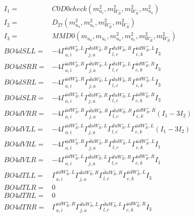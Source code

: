 \documentclass[A4,landscape]{article}
\begin{document}
\begin{align} 
I_1 = & C0D0check(m^2_{u_{{c}}}, m^2_{W_R^-}, m^2_{W_R^-}, m^2_{u_{{a}}}) \\ 
I_2 = & D_{27}(m^2_{u_{{a}}}, m^2_{u_{{c}}}, m^2_{W_R^-}, m^2_{W_R^-}) \\ 
I_3 = & MMD0(m_{u_{{a}}}, m_{u_{{c}}}, m^2_{u_{{a}}}, m^2_{u_{{c}}}, m^2_{W_R^-}, m^2_{W_R^-}) \\ 
  BO4dSLL= & -4  \Gamma^{\bar{u}d W_R^+,L}_{a, i} \Gamma^{\bar{d}u W_R^- ,R}_{j, a} \Gamma^{\bar{d}u W_R^- ,R}_{l, c} \Gamma^{\bar{u}d W_R^+,L}_{c, k} I_3 \\ 
  BO4dSRR= & -4  \Gamma^{\bar{u}d W_R^+,R}_{a, i} \Gamma^{\bar{d}u W_R^- ,L}_{j, a} \Gamma^{\bar{d}u W_R^- ,L}_{l, c} \Gamma^{\bar{u}d W_R^+,R}_{c, k} I_3 \\ 
  BO4dSRL= & -4  \Gamma^{\bar{u}d W_R^+,R}_{a, i} \Gamma^{\bar{d}u W_R^- ,L}_{j, a} \Gamma^{\bar{d}u W_R^- ,R}_{l, c} \Gamma^{\bar{u}d W_R^+,L}_{c, k} I_3 \\ 
  BO4dSLR= & -4  \Gamma^{\bar{u}d W_R^+,L}_{a, i} \Gamma^{\bar{d}u W_R^- ,R}_{j, a} \Gamma^{\bar{d}u W_R^- ,L}_{l, c} \Gamma^{\bar{u}d W_R^+,R}_{c, k} I_3 \\ 
  BO4dVRR= & -4  \Gamma^{\bar{u}d W_R^+,R}_{a, i} \Gamma^{\bar{d}u W_R^- ,R}_{j, a} \Gamma^{\bar{d}u W_R^- ,R}_{l, c} \Gamma^{\bar{u}d W_R^+,R}_{c, k} (I_1 - 3 I_2) \\ 
  BO4dVLL= & -4  \Gamma^{\bar{u}d W_R^+,L}_{a, i} \Gamma^{\bar{d}u W_R^- ,L}_{j, a} \Gamma^{\bar{d}u W_R^- ,L}_{l, c} \Gamma^{\bar{u}d W_R^+,L}_{c, k} (I_1 - 3 I_2) \\ 
  BO4dVRL= & -4  \Gamma^{\bar{u}d W_R^+,R}_{a, i} \Gamma^{\bar{d}u W_R^- ,R}_{j, a} \Gamma^{\bar{d}u W_R^- ,L}_{l, c} \Gamma^{\bar{u}d W_R^+,L}_{c, k} I_1 \\ 
  BO4dVLR= & -4  \Gamma^{\bar{u}d W_R^+,L}_{a, i} \Gamma^{\bar{d}u W_R^- ,L}_{j, a} \Gamma^{\bar{d}u W_R^- ,R}_{l, c} \Gamma^{\bar{u}d W_R^+,R}_{c, k} I_1 \\ 
  BO4dTLL= &  \Gamma^{\bar{u}d W_R^+,L}_{a, i} \Gamma^{\bar{d}u W_R^- ,R}_{j, a} \Gamma^{\bar{d}u W_R^- ,R}_{l, c} \Gamma^{\bar{u}d W_R^+,L}_{c, k} I_3 \\ 
  BO4dTLR= & 0 \\ 
  BO4dTRL= & 0 \\ 
  BO4dTRR= &  \Gamma^{\bar{u}d W_R^+,R}_{a, i} \Gamma^{\bar{d}u W_R^- ,L}_{j, a} \Gamma^{\bar{d}u W_R^- ,L}_{l, c} \Gamma^{\bar{u}d W_R^+,R}_{c, k} I_3 \\ 
\end{align} 
\end{document}
